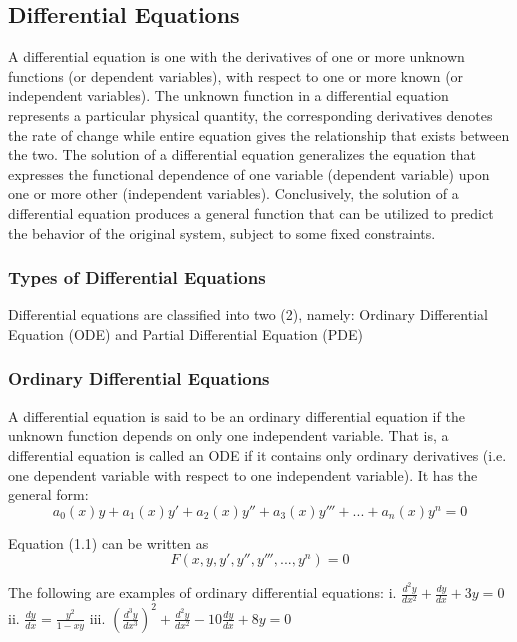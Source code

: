 \documentclass[12pt]{article}
\begin{document}
\subsection{Differential Equations}
\noindent A  differential equation is one with the derivatives of one or more unknown functions (or dependent variables), with respect to one or more known (or independent variables). The unknown function in a differential equation represents a particular physical quantity, the corresponding derivatives denotes the rate of change while entire equation gives the relationship that exists between the two. The solution of a differential equation generalizes the equation that expresses the functional dependence of one variable (dependent variable) upon one or more other (independent variables). Conclusively, the solution of a differential equation produces a general function that can be utilized to predict the behavior of the original system, subject to some fixed constraints. 
	
	\subsubsection{Types of Differential Equations}
	Differential equations are classified into two (2), namely: Ordinary Differential Equation (ODE) and Partial Differential Equation (PDE)

	\subsubsection*{Ordinary Differential Equations}
		
	A differential equation is said to be an ordinary differential equation if the unknown function depends on only one independent variable. That is, a differential equation is called an ODE if it contains only ordinary derivatives (i.e. one dependent variable with respect to one independent variable). It has the general form: 
\begin{equation}
a_{0} (x)y+ a_{1} (x) y'+ a_{2} (x) y''+ a_{3} (x) y'''+...+ a_{n} (x) y^{n}=0
\end{equation}

Equation (1.1) can be written as 
\begin{equation}
F(x,y,y',y'',y''',...,y^{n})=0
\end{equation}

The following are examples of ordinary differential equations: 
i. $	\frac{d^{2} y}{dx^{2} }+  \frac{dy}{dx}+3y=0$ 
ii. $\frac{dy}{dx} = \frac{y^{2}}{1-xy} $  
iii. $(\frac{d^{3} y}{dx^{3} })^{2} + \frac{d^{2} y}{dx^{2} } - 10\frac{dy}{dx} +8y = 0 $
 
\end{document}
